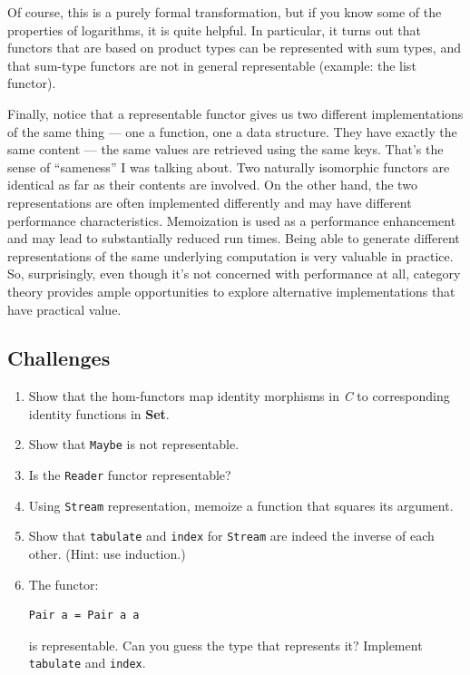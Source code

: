 Of course, this is a purely formal transformation, but if you know some
of the properties of logarithms, it is quite helpful. In particular, it
turns out that functors that are based on product types can be
represented with sum types, and that sum-type functors are not in
general representable (example: the list functor).

Finally, notice that a representable functor gives us two different
implementations of the same thing --- one a function, one a data
structure. They have exactly the same content --- the same values are
retrieved using the same keys. That's the sense of ``sameness'' I was
talking about. Two naturally isomorphic functors are identical as far as
their contents are involved. On the other hand, the two representations
are often implemented differently and may have different performance
characteristics. Memoization is used as a performance enhancement and
may lead to substantially reduced run times. Being able to generate
different representations of the same underlying computation is very
valuable in practice. So, surprisingly, even though it's not concerned
with performance at all, category theory provides ample opportunities to
explore alternative implementations that have practical value.

\subsection{Challenges}\label{challenges}

\begin{enumerate}
\item
  Show that the hom-functors map identity morphisms in \emph{C} to
  corresponding identity functions in \textbf{Set}.
\item
  Show that \texttt{Maybe} is not representable.
\item
  Is the \texttt{Reader} functor representable?
\item
  Using \texttt{Stream} representation, memoize a function that squares
  its argument.
\item
  Show that \texttt{tabulate} and \texttt{index} for \texttt{Stream} are
  indeed the inverse of each other. (Hint: use induction.)
\item
  The functor:

\begin{verbatim}
Pair a = Pair a a
\end{verbatim}

  is representable. Can you guess the type that represents it? Implement
  \texttt{tabulate} and \texttt{index}.
\end{enumerate}

